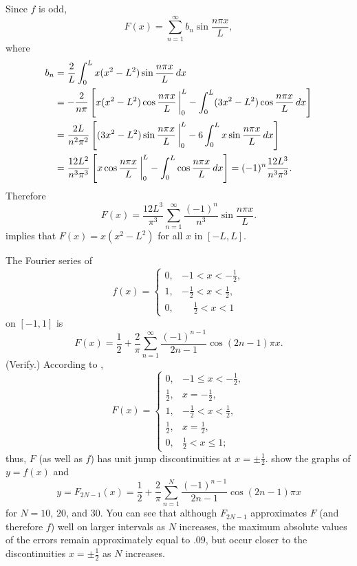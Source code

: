 \begin{solution}
Since $f$ is odd,
\[
F(x)=\sum_{n=1}^\infty b_n\sin\frac{n\pi x}{L},
\]
where
\begin{align*}
b_n&=\frac{2}{L}\int_0^Lx(x^2-L^2)\sin\frac{n\pi x}{L}\,dx\\
&=-\frac{2}{n\pi}\left[x(x^2-L^2)\cos\frac{n\pi x}{L}\,\bigg|_{0}^{L}-
\int_0^L
(3x^2-L^2)\cos\frac{n\pi x}{L}\,dx\right]\\
&=\frac{2L}{n^2\pi^2}\left[(3x^2-L^2)\sin\frac{n\pi x}{L}\,\bigg|_{0}^{L}-6
\int_0^Lx\sin\frac{n\pi x}{L}\,dx\right]\\
&=\frac{12L^2}{n^3\pi^3}\left[x\cos\frac{n\pi x}{L}\,\bigg|_{0}^{L}-
\int_0^L\cos\frac{n\pi x}{L}\,dx\right]
=(-1)^n\frac{12L^3}{n^3\pi^3}.
\end{align*}
Therefore
\[
F(x)=\frac{12L^3}{\pi^3}\sum_{n=1}^\infty\frac{(-1)^n}{n^3}\sin\frac{n\pi
x}{L}.
\]
 implies that $F(x)=x(x^2-L^2)$ for all $x$
in $[-L,L]$.
\end{solution}

\begin{example}\label{example:11.2.7}
The Fourier series of
\[
f(x)=\begin{cases}
0,&-1<x<-\frac{1}{2},\\
1,&-\frac{1}{2}<x<\frac{1}{2},\\
0,&\phantom{-}\frac{1}{2}<x<1
\end{cases}
\]
on $[-1,1]$ is
\[
F(x)=\frac{1}{2}+\frac{2}{\pi}\sum_{n=1}^\infty
\frac{(-1)^{n-1}}{2n-1}\cos(2n-1)\pi x.
\]
(Verify.) According to ,
\[
F(x)=\begin{cases}
0,&-1\le x<-\frac{1}{2},\\
\frac{1}{2},& x=-\frac{1}{2},\\
1,&-\frac{1}{2}<x<\frac{1}{2},\\
\frac{1}{2},& x=\frac{1}{2},\\
0,&\frac{1}{2}<x\le 1;
\end{cases}
\]
thus, $F$ (as well as $f$) has unit jump discontinuities
at $x=\pm\frac{1}{2}$.
 show the graphs
of $y=f(x)$ and
\[
y=F_{2N-1}(x)=\frac{1}{2}+
\frac{2}{\pi}\sum_{n=1}^N \frac{(-1)^{n-1}}{2n-1}\cos(2n-1)\pi x
\]
for $N=10$, $20$, and $30$. You can see that although $F_{2N-1}$
approximates $F$ (and therefore $f$) well on larger intervals as $N$
increases, the maximum absolute values of the errors
remain approximately equal to $.09$, but occur closer to the
discontinuities $x=\pm\frac{1}{2}$ as $N$ increases.
\end{example}

